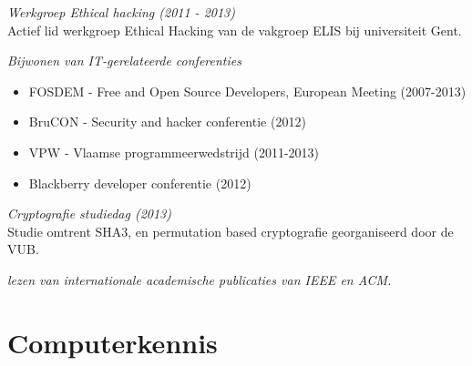 \documentclass[margin, 10pt]{res} %
\begin{document}
\begin{resume}
{\sl Werkgroep Ethical hacking (2011 - 2013)} \\
Actief lid werkgroep Ethical Hacking van de vakgroep ELIS bij universiteit Gent.

{\sl Bijwonen van IT-gerelateerde conferenties}
\begin{itemize} \itemsep -2pt
\item FOSDEM - Free and Open Source Developers, European Meeting (2007-2013)
\item BruCON - Security and hacker conferentie (2012)
\item VPW - Vlaamse programmeerwedstrijd (2011-2013)
\item Blackberry developer conferentie (2012)
\end{itemize}

{\sl Cryptografie studiedag (2013)} \\
Studie omtrent SHA3, en permutation based cryptografie georganiseerd door de VUB.

{\sl lezen van internationale academische publicaties van IEEE en ACM.}

\end{resume}
\pagebreak
\section{Computerkennis}
\end{document}
